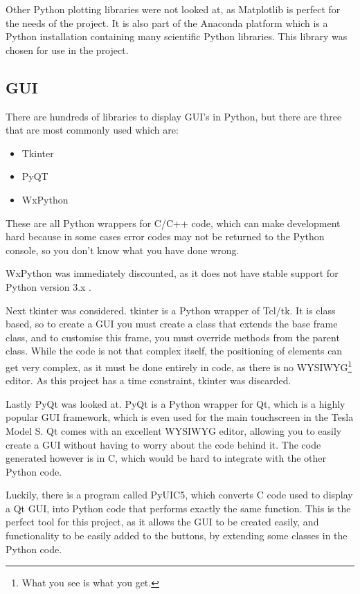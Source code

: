 Other Python plotting libraries were not looked at, as Matplotlib is perfect for the needs of the project. It is also part of the Anaconda platform\autocite{conda} which is a Python installation containing many scientific Python libraries.  This library was chosen for use in the project.

\subsection{GUI}
There are hundreds of libraries to display GUI's in Python, but there are three that are most commonly used which are:
\begin{itemize}
	\item Tkinter
	\item PyQT
	\item WxPython
\end{itemize}
These are all Python wrappers for C/C++ code, which can make development hard because in some cases error codes may not be returned to the Python console, so you don't know what you have done wrong.

WxPython was immediately discounted, as it does not have stable support for Python version 3.x .

Next tkinter was considered. tkinter is a Python wrapper of Tcl/tk. It is class based, so to create a GUI you must create a class that extends the base frame class, and to customise this frame, you must override methods from the parent class. While the code is not that complex itself, the positioning of elements can get very complex, as it must be done entirely in code, as there is no WYSIWYG\footnote{What you see is what you get.} editor. As this project has a time constraint, tkinter was discarded.

Lastly PyQt was looked at. PyQt is a Python wrapper for Qt, which is a highly popular GUI framework, which is even used for the main touchscreen in the Tesla Model S. Qt comes with an excellent WYSIWYG editor, allowing you to easily create a GUI without having to worry about the code behind it. The code generated however is in C, which would be hard to integrate with the other Python code.

Luckily, there is a program called PyUIC5, which converts C code used to display a Qt GUI, into Python code that performs exactly the same function. This is the perfect tool for this project, as it allows the GUI to be created easily, and functionality to be easily added to the buttons, by extending some classes in the Python code.

